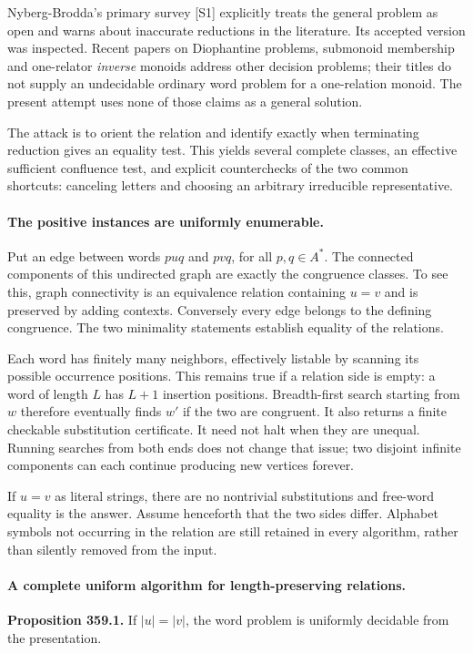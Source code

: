 \documentclass[11pt]{article}
\begin{document}
Nyberg-Brodda's primary survey [S1] explicitly treats the general problem
as open and warns about inaccurate reductions in the literature. Its
accepted version was inspected. Recent papers on Diophantine problems,
submonoid membership and one-relator \emph{inverse} monoids address
other decision problems; their titles do not supply an undecidable
ordinary word problem for a one-relation monoid. The present attempt
uses none of those claims as a general solution.

The attack is to orient the relation and identify exactly when terminating
reduction gives an equality test. This yields several complete classes,
an effective sufficient confluence test, and explicit counterchecks of
the two common shortcuts: canceling letters and choosing an arbitrary
irreducible representative.

\paragraph{The positive instances are uniformly enumerable.}
Put an edge between words $p u q$ and $p v q$, for all $p,q\in A^*$.
The connected components of this undirected graph are exactly the
congruence classes. To see this, graph connectivity is an equivalence
relation containing $u=v$ and is preserved by adding contexts. Conversely
every edge belongs to the defining congruence. The two minimality
statements establish equality of the relations.

Each word has finitely many neighbors, effectively listable by scanning
its possible occurrence positions. This remains true if a relation side
is empty: a word of length $L$ has $L+1$ insertion positions. Breadth-first
search starting from $w$ therefore eventually finds $w'$ if the two
are congruent. It also returns a finite checkable substitution certificate.
It need not halt when they are unequal. Running searches from both ends
does not change that issue; two disjoint infinite components can each
continue producing new vertices forever.

If $u=v$ as literal strings, there are no nontrivial substitutions and
free-word equality is the answer. Assume henceforth that the two sides
differ. Alphabet symbols not occurring in the relation are still retained
in every algorithm, rather than silently removed from the input.

\paragraph{A complete uniform algorithm for length-preserving relations.}
\textbf{Proposition 359.1.} If $|u|=|v|$, the word problem is uniformly
decidable from the presentation.
\end{document}
